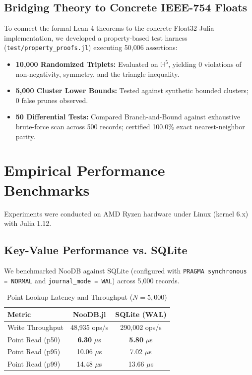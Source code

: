\documentclass[10pt,twocolumn,a4paper]{article}
\begin{document}
\subsection{Bridging Theory to Concrete IEEE-754 Floats}
To connect the formal Lean 4 theorems to the concrete Float32 Julia implementation, we developed a property-based test harness (\texttt{test/property\_proofs.jl}) executing 50,006 assertions:
\begin{itemize}
    \item \textbf{10,000 Randomized Triplets:} Evaluated on $\mathbb{H}^5$, yielding 0 violations of non-negativity, symmetry, and the triangle inequality.
    \item \textbf{5,000 Cluster Lower Bounds:} Tested against synthetic bounded clusters; 0 false prunes observed.
    \item \textbf{50 Differential Tests:} Compared Branch-and-Bound against exhaustive brute-force scan across 500 records; certified 100.0\% exact nearest-neighbor parity.
\end{itemize}

\section{Empirical Performance Benchmarks}

Experiments were conducted on AMD Ryzen hardware under Linux (kernel 6.x) with Julia 1.12.

\subsection{Key-Value Performance vs. SQLite}
We benchmarked NooDB against SQLite (configured with \texttt{PRAGMA synchronous = NORMAL} and \texttt{journal\_mode = WAL}) across 5,000 records.

\begin{table}[h]
\centering
\small
\begin{tabular}{lcc}
\toprule
\textbf{Metric} & \textbf{NooDB.jl} & \textbf{SQLite (WAL)} \\
\midrule
Write Throughput & 48,935 ops/s & 290,002 ops/s \\
Point Read (p50) & \textbf{6.30} $\mu$s & \textbf{5.80} $\mu$s \\
Point Read (p95) & 10.06 $\mu$s & 7.02 $\mu$s \\
Point Read (p99) & 14.48 $\mu$s & 13.66 $\mu$s \\
\bottomrule
\end{tabular}
\caption{Point Lookup Latency and Throughput ($N=5,000$)}
\end{table}
\end{document}

